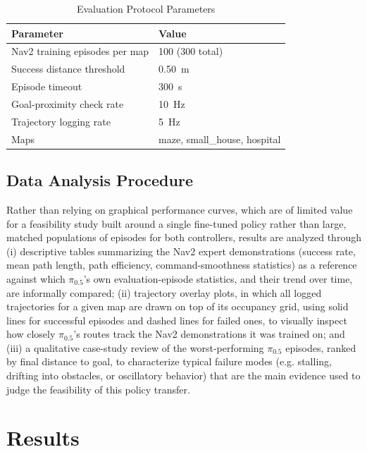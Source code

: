 \documentclass[conference]{IEEEtran}
\begin{document}
\begin{table}[htbp]
\caption{Evaluation Protocol Parameters}
\label{tab:eval-params}
\centering
\begin{tabular}{ll}
\hline
\textbf{Parameter} & \textbf{Value} \\
\hline
Nav2 training episodes per map & 100 (300 total) \\
Success distance threshold & 0.50~m \\
Episode timeout & 300~s \\
Goal-proximity check rate & 10~Hz \\
Trajectory logging rate & 5~Hz \\
Maps & maze, small\_house, hospital \\
\hline
\end{tabular}
\end{table}

\subsection{Data Analysis Procedure}
Rather than relying on graphical performance curves, which are of limited value for a feasibility study built around a single fine-tuned policy rather than large, matched populations of episodes for both controllers, results are analyzed through (i) descriptive tables summarizing the Nav2 expert demonstrations (success rate, mean path length, path efficiency, command-smoothness statistics) as a reference against which $\pi_{0.5}$'s own evaluation-episode statistics, and their trend over time, are informally compared; (ii) trajectory overlay plots, in which all logged trajectories for a given map are drawn on top of its occupancy grid, using solid lines for successful episodes and dashed lines for failed ones, to visually inspect how closely $\pi_{0.5}$'s routes track the Nav2 demonstrations it was trained on; and (iii) a qualitative case-study review of the worst-performing $\pi_{0.5}$ episodes, ranked by final distance to goal, to characterize typical failure modes (e.g. stalling, drifting into obstacles, or oscillatory behavior) that are the main evidence used to judge the feasibility of this policy transfer.

\section{Results}



\end{document}
